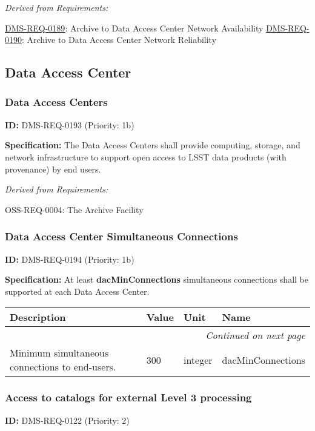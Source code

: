 \documentclass[SE,toc,lsstdraft]{lsstdoc}
\makeatletter
\newcommand{\paramname}[1]{\hspace{0pt}#1}
\newcommand{\unitname}[1]{\hspace{0pt}#1}
\newenvironment{parameters}[0]{%
\setlength\LTleft{0pt}
\setlength\LTright{\fill}
\begin{small}
\begin{longtable}[]{|p{0.49\textwidth}|l|p{0.6in}|p{1.70in}@{}|}

\hline \textbf{Description} & \textbf{Value} & \textbf{Unit} & \textbf{Name} \\ \hline
\endhead

\hline \multicolumn{4}{r}{\emph{Continued on next page}} \\
\endfoot

\hline\hline
\endlastfoot
}{%
\hline
\end{longtable}
\end{small}
}
\makeatother
\begin{document}
\emph{Derived from Requirements:}

\hyperref[DMS-REQ-0189]{DMS-REQ-0189}:
Archive to Data Access Center Network Availability \newline
\hyperref[DMS-REQ-0190]{DMS-REQ-0190}:
Archive to Data Access Center Network Reliability \newline

\subsection{Data Access Center}

\subsubsection{Data Access Centers}

\label{DMS-REQ-0193}
\textbf{ID:} DMS-REQ-0193 (Priority: 1b)

\textbf{Specification:} The Data Access Centers shall provide computing, storage, and network infrastructure to support open access to LSST data products (with provenance) by end users.

\emph{Derived from Requirements:}

OSS-REQ-0004:
The Archive Facility \newline

\subsubsection{Data Access Center Simultaneous Connections}

\label{DMS-REQ-0194}
\textbf{ID:} DMS-REQ-0194 (Priority: 1b)

\textbf{Specification:} At least \textbf{dacMinConnections }simultaneous connections shall be supported at each Data Access Center.

\begin{parameters}
Minimum simultaneous connections to end-users.
&
300
&
\unitname{%
integer
}
&
\paramname{%
dacMinConnections
} \\\hline
\end{parameters}

\subsubsection{Access to catalogs for external Level 3 processing}

\label{DMS-REQ-0122}
\textbf{ID:} DMS-REQ-0122 (Priority: 2)
\end{document}

